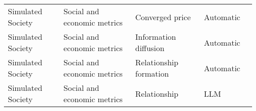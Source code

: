 \begin{small}
\begin{center}
\begin{longtable}{@{}p{}p{}p{}p{}p{}@{}}
Simulated Society        & Social and economic metrics         & Converged price                                                                                                                                                                                             & Automatic & \cite{toledozucco2024scatteringpassivestructurepreservingfiniteelement}                                                                                                                                                                                                                                                                                                                                                                                              \\
Simulated Society        & Social and economic metrics         & Information diffusion                                                                                                                                                                                       & Automatic & \cite{park2023generative}                                                                                                                                                                                                                                                                                                                                                                                \\
Simulated Society        & Social and economic metrics         & Relationship formation                                                                                                                                                                                      & Automatic & \cite{park2023generative}                                                                                                                                                                                                                                                                                                                                                                                \\
Simulated Society        & Social and economic metrics         & Relationship                                                                                                                                                                                                & LLM       & \cite{zhou2024sotopiainteractiveevaluationsocial}                                                                                                                                                                                                                                                                                                                                                                                              \\

\end{longtable}
\end{center}
\end{small}
